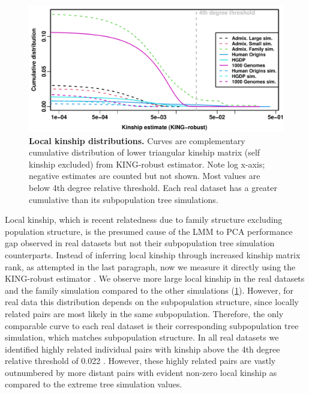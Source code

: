 \documentclass[11pt]{article}
\begin{document}
\begin{linenumbers}
\begin{figure}[b!]
  \centering
  \includegraphics[width=\textwidth]{king_log-x.pdf}
  \caption{
    {\bf Local kinship distributions.}
    Curves are complementary cumulative distribution of lower triangular kinship matrix (self kinship excluded) from KING-robust estimator.
    Note log x-axis; negative estimates are counted but not shown.
    Most values are below 4th degree relative threshold.
    Each real dataset has a greater cumulative than its subpopulation tree simulations.
  }
  \label{fig:king}
\end{figure}

Local kinship, which is recent relatedness due to family structure excluding population structure, is the presumed cause of the LMM to PCA performance gap observed in real datasets but not their subpopulation tree simulation counterparts.
Instead of inferring local kinship through increased kinship matrix rank, as attempted in the last paragraph, now we measure it directly using the KING-robust estimator \citep{manichaikul_robust_2010}.
We observe more large local kinship in the real datasets and the family simulation compared to the other simulations (\cref{fig:king}).
However, for real data this distribution depends on the subpopulation structure, since locally related pairs are most likely in the same subpopulation.
Therefore, the only comparable curve to each real dataset is their corresponding subpopulation tree simulation, which matches subpopulation structure.
In all real datasets we identified highly related individual pairs with kinship above the 4th degree relative threshold of 0.022 \citep{manichaikul_robust_2010, conomos_model-free_2016}.
However, these highly related pairs are vastly outnumbered by more distant pairs with evident non-zero local kinship as compared to the extreme tree simulation values.


\end{linenumbers}
\end{document}
